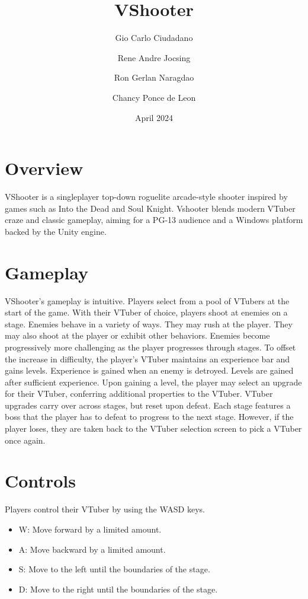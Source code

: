 \documentclass[10pt, a4paper]{article}
\title{\textbf{VShooter}}
\author{Gio Carlo Ciudadano \and Rene Andre Jocsing \and Ron Gerlan Naragdao \and Chancy Ponce de Leon}
\date{April 2024}
\begin{document}
\maketitle

	\begin{multicols}{2}

	\section{Overview}

	VShooter is a singleplayer top-down roguelite arcade-style shooter inspired by games such as Into the Dead and Soul Knight. Vshooter blends modern VTuber craze and classic gameplay, aiming for a PG-13 audience and a Windows platform backed by the Unity engine.

  	\section{Gameplay}

	VShooter's gameplay is intuitive. Players select from a pool of VTubers at the start of the game. With their VTuber of choice, players shoot at enemies on a stage. Enemies behave in a variety of ways. They may rush at the player. They may also shoot at the player or exhibit other behaviors. Enemies become progressively more challenging as the player progresses through stages. To offset the increase in difficulty, the player's VTuber maintains an experience bar and gains levels. Experience is gained when an enemy is detroyed. Levels are gained after sufficient experience. Upon gaining a level, the player may select an upgrade for their VTuber, conferring additional properties to the VTuber. VTuber upgrades carry over across stages, but reset upon defeat. Each stage features a boss that the player has to defeat to progress to the next stage. However, if the player loses, they are taken back to the VTuber selection screen to pick a VTuber once again.

	\section{Controls}

	Players control their VTuber by using the WASD keys.

	\begin{itemize}
		\item W: Move forward by a limited amount.
		\item A: Move backward by a limited amount.
		\item S: Move to the left until the boundaries of the stage.
		\item D: Move to the right until the boundaries of the stage.
	\end{itemize}


\end{multicols}
\end{document}
